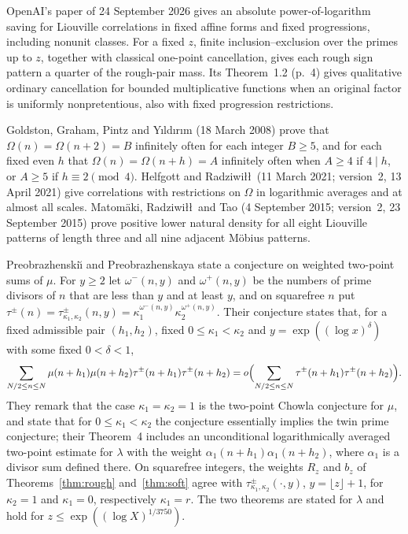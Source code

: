 \documentclass[11pt]{article}
\theoremstyle{definition}
\theoremstyle{remark}
\numberwithin{equation}{section}
\begin{document}
OpenAI's paper of 24 September 2026 \cite[Theorem~1.1 and Proposition~2.1, pp.~3, 7]{OpenAI007} gives an absolute
power-of-logarithm saving for Liouville correlations in fixed affine forms and fixed progressions, including
nonunit classes. For a fixed $z$, finite inclusion--exclusion over the primes up to $z$, together with classical
one-point cancellation, gives each rough sign pattern a quarter of the rough-pair mass. Its
Theorem~1.2 (p.~4) gives qualitative ordinary cancellation for bounded multiplicative functions when an original
factor is uniformly nonpretentious, also with fixed progression restrictions.

Goldston, Graham, Pintz and Y\i ld\i r\i m (18 March 2008) \cite[Theorems~6 and~9, pp.~5, 7]{GGPPY} prove that
$\Omega(n)=\Omega(n+2)=B$ infinitely often for each integer $B\ge5$, and for each fixed even $h$ that
$\Omega(n)=\Omega(n+h)=A$ infinitely often when $A\ge4$ if $4\mid h$, or $A\ge5$ if $h\equiv2\pmod4$.
Helfgott and Radziwi\l\l\ (11 March 2021; version~2, 13 April 2021) \cite[Corollaries~1.4, 1.7--1.8, pp.~5--7]{HR}
give correlations with restrictions on $\Omega$ in logarithmic averages and at almost all scales.
Matom\"aki, Radziwi\l\l\ and Tao (4 September 2015; version~2, 23 September 2015)
\cite[Theorems~1.6 and~1.9, pp.~2--3]{MRTpatterns} prove positive lower natural density for all eight Liouville
patterns of length three and all nine adjacent M\"obius patterns.

Preobrazhenski\u{\i} and
Preobrazhenskaya \cite[Conjecture~2, p.~3]{PP2015} state a conjecture on weighted two-point sums of $\mu$. For $y\ge2$ let $\omega^-(n,y)$ and $\omega^+(n,y)$ be the
numbers of prime divisors of $n$ that are less than $y$ and at least $y$, and on squarefree $n$ put
$\tau^{\pm}(n)=\tau^{\pm}_{\kappa_1,\kappa_2}(n,y)=\kappa_1^{\omega^-(n,y)}\kappa_2^{\omega^+(n,y)}$.
Their conjecture states that, for a fixed admissible pair $(h_1,h_2)$, fixed $0\le\kappa_1<\kappa_2$ and $y=\exp((\log x)^\delta)$ with some fixed
$0<\delta<1$,
\[
\sum_{N/2\le n\le N}\mu(n+h_1)\mu(n+h_2)\tau^{\pm}(n+h_1)\tau^{\pm}(n+h_2)
=o\Bigl(\sum_{N/2\le n\le N}\tau^{\pm}(n+h_1)\tau^{\pm}(n+h_2)\Bigr).
\]
They remark that the case $\kappa_1=\kappa_2=1$ is the two-point Chowla conjecture for $\mu$, and state that for
$0\le\kappa_1<\kappa_2$ the conjecture essentially implies the twin prime conjecture; their Theorem~4 includes an unconditional
logarithmically averaged two-point estimate for $\lambda$ with the weight $\alpha_1(n+h_1)\alpha_1(n+h_2)$, where $\alpha_1$ is a divisor sum defined there. On squarefree integers, the weights $R_z$ and $b_z$ of
Theorems~\ref{thm:rough} and~\ref{thm:soft} agree with $\tau^{\pm}_{\kappa_1,\kappa_2}(\cdot,y)$, $y=\lfloor z\rfloor+1$, for $\kappa_2=1$ and $\kappa_1=0$, respectively
$\kappa_1=r$. The two theorems are stated for $\lambda$ and
hold for $z\le\exp((\log X)^{1/3750})$.
\end{document}
